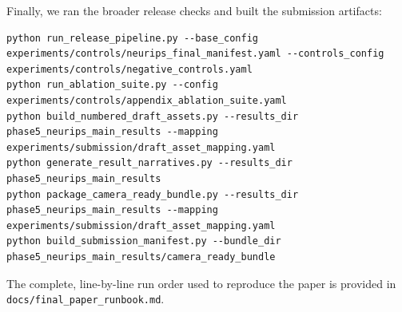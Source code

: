 Finally, we ran the broader release checks and built the submission artifacts:
\begin{verbatim}
python run_release_pipeline.py --base_config experiments/controls/neurips_final_manifest.yaml --controls_config experiments/controls/negative_controls.yaml
python run_ablation_suite.py --config experiments/controls/appendix_ablation_suite.yaml
python build_numbered_draft_assets.py --results_dir phase5_neurips_main_results --mapping experiments/submission/draft_asset_mapping.yaml
python generate_result_narratives.py --results_dir phase5_neurips_main_results
python package_camera_ready_bundle.py --results_dir phase5_neurips_main_results --mapping experiments/submission/draft_asset_mapping.yaml
python build_submission_manifest.py --bundle_dir phase5_neurips_main_results/camera_ready_bundle
\end{verbatim}

The complete, line-by-line run order used to reproduce the paper is provided in \texttt{docs/final\_paper\_runbook.md}.
